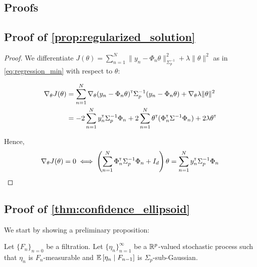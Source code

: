 \begin{subappendices}
	
	\section{Proofs}
	\label{sec:proof}
	
	\subsection{Proof of \autoref{prop:regularized_solution}}
	
	\begin{proof}
		We differentiate $J(\theta) = \sum_{n=1}^N \|y_n -\Phi_n\theta\|_{\Sigma_p^{-1}}^2 + \lambda\|\theta\|_{}^2$ as in  \eqref{eq:regression_min} with respect to $\theta$:
		
		\begin{align*}
		\nabla_{\theta} J(\theta) &= \sum_{n=1}^N\nabla_{\theta} (y_n - \Phi_n\theta)^{\mathsf{\scriptscriptstyle T}}\Sigma_p^{-1}(y_n - \Phi_n\theta) + \nabla_{\theta} \lambda\|\theta\|_{}^2\\
		&= -2\sum_{n=1}^N y_n^{\mathsf{\scriptscriptstyle T}}\Sigma_p^{-1}\Phi_n + 2\sum_{n=1}^N\theta^{\mathsf{\scriptscriptstyle T}}(\Phi_n^{\mathsf{\scriptscriptstyle T}}\Sigma^{-1}\Phi_n) +  2 \lambda \theta^{\mathsf{\scriptscriptstyle T}}
		\end{align*}
		
		Hence,
		\begin{align*}
		\nabla_{\theta} J(\theta) = 0 \iff \left(\sum_{n=1}^N\Phi_n^{\mathsf{\scriptscriptstyle T}}\Sigma_p^{-1}\Phi_n + I_d\right)\theta = \sum_{n=1}^N y_n^{\mathsf{\scriptscriptstyle T}}\Sigma_p^{-1}\Phi_n
		\end{align*}
	\end{proof}
	
	\subsection{Proof of \autoref{thm:confidence_ellipsoid}}
	
	We start by showing a preliminary proposition:
	
	\begin{proposition}
		\label{prop:concentration}
		Let $\{F_n\}_{n=0}$ be a filtration.
		Let $\{\eta_n\}_{n=1}^\infty$ be a $\mathbb{R}^p$-valued stochastic process such that $\eta_n$ is $F_n$-measurable and $\operatorname*{\mathbb{E}}\left[\eta_n\;\middle|\; F_{n-1}\right]$ is $\Sigma_p$-sub-Gaussian.
		

\end{proposition}
\end{subappendices}
